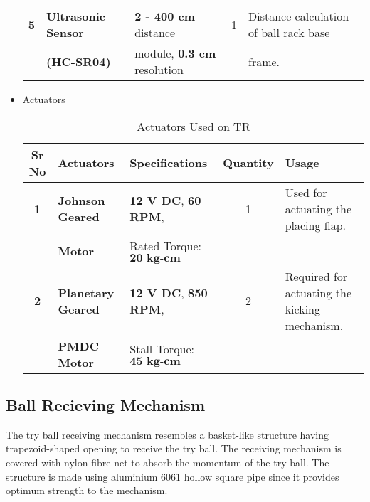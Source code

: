 \begin{itemize}
\begin{table}[h]
\begin{tabular}{|c|l|l|c|l|}
                    \textbf{5}      & \textbf{Ultrasonic Sensor}        & \textbf{2 - 400 cm} distance          &        1          & Distance calculation of ball rack base                    \\ 
                                    & \textbf{(HC-SR04)}                & module, \textbf{0.3 cm} resolution    &                   & frame.                                                    \\ \hline   \hline
                \end{tabular}
            \end{table}

            \item Actuators
            \begin{table}[h]
                \caption {Actuators Used on TR} \label{Actuators_TR}  \small
                \begin{tabular}{|c|l|l|c|l|}
                    \hline  \hline
                    \textbf{Sr No}  & \textbf{Actuators}        & \textbf{Specifications}               & \textbf{Quantity}  & \textbf{Usage}                                               \\ \hline   \hline
                    \textbf{1}      & \textbf{Johnson Geared}   & \textbf{12 V DC},  \textbf{60 RPM},   & 1                  & Used for actuating the placing flap.                         \\
                                    & \textbf{Motor}            & Rated Torque: $\textbf{20 kg-cm}$     &                    &                                                              \\ \hline 
                    \textbf{2}      & \textbf{Planetary Geared} & \textbf{12 V DC},  \textbf{850 RPM},  & 2                  & Required for actuating the kicking mechanism.                \\
                                    & \textbf{PMDC Motor}       & Stall Torque: $\textbf{45 kg-cm}$     &                    &                                                              \\ \hline   \hline  
                \end{tabular}
            \end{table}
        \end{itemize}


    \subsection{Ball Recieving Mechanism}
        The try ball receiving mechanism resembles a basket-like structure having trapezoid-shaped opening to receive the try ball. The receiving mechanism is covered with nylon fibre net to absorb the momentum 
        of the try ball. The structure is made using aluminium 6061 hollow square pipe since it provides optimum strength to the mechanism.
    

